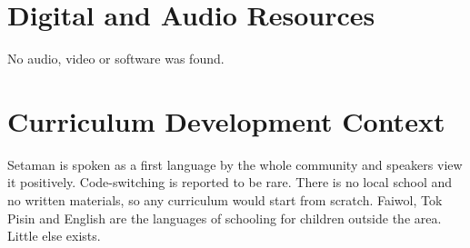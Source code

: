 \documentclass[12pt]{article}
\begin{document}
\section{Digital and Audio Resources}
No audio, video or software was found.

\section{Curriculum Development Context}
Setaman is spoken as a first language by the whole community and speakers view it positively. Code-switching is reported to be rare. There is no local school and no written materials, so any curriculum would start from scratch. Faiwol, Tok Pisin and English are the languages of schooling for children outside the area. Little else exists.
\end{document}
